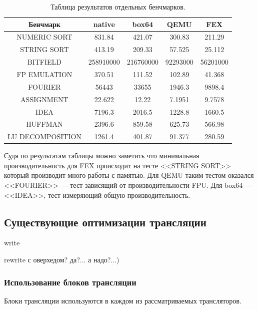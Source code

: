 \begin{table}[!htb]
	\label{table:benches}
	\begin{center}
		\caption{Таблица результатов отдельных бенчмарков.}
		\begin{tabular}{|c|c|c|c|c|}
			\hline
			\bfseries Бенчмарк & \bfseries native & \bfseries box64 & \bfseries QEMU & \bfseries FEX  \\
			\hline
			NUMERIC SORT & 831.84 & 421.07 & 300.83 & 211.29 \\ \hline
			STRING SORT & 413.19 & 209.33 & 57.525 & 25.112 \\ \hline
			BITFIELD & 258910000 & 216760000 & 92293000 & 56201000 \\ \hline
			FP EMULATION & 370.51 & 111.52 & 102.89 & 41.368 \\ \hline
			FOURIER & 56443 & 33655 & 1946.3 & 9898.4 \\ \hline
			ASSIGNMENT & 22.622 & 12.22 & 7.1951 & 9.7578 \\ \hline
			IDEA & 7196.3 & 2016.5 & 1228.8 & 1660.5 \\ \hline
			HUFFMAN & 2396.6 & 859.58 & 625.73 & 566.98 \\ \hline
			LU DECOMPOSITION & 1261.4 & 401.87 & 91.377 & 280.59 \\ \hline
		\end{tabular}
	\end{center}
\end{table}

\newpage

Судя по результатам таблицы можно заметить что минимальная производительность для FEX происходит на тесте <<STRING SORT>> который производит много работы с памятью. Для QEMU таким тестом оказался <<FOURIER>> --- тест зависящий от производительности FPU. Для box64 --- <<IDEA>>, тест измеряющий общую производительность.

\subsection{Существующие оптимизации трансляции}

write

rewrite с оверхедом? да?... а надо?...)

\subsubsection{Использование блоков трансляции}

Блоки трансляции используются в каждом из рассматриваемых трансляторов.

